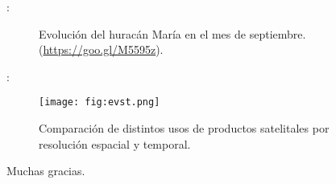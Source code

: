 \begin{frame}{\secname : \subsecname}
    \begin{figure}[h!]
    \centering
    \caption{Evolución del huracán María en el mes de septiembre. (\href{https://goo.gl/M5595z}{https://goo.gl/M5595z}).}
    \end{figure}
\end{frame}

\begin{frame}{\secname : \subsecname}
    \begin{figure}[h!]
        \centering
        \texttt{[image: fig:evst.png]}
        \caption{Comparación de distintos usos de productos satelitales por resolución espacial y temporal.}
        \label{fig:evst}
    \end{figure}
\end{frame}

\begin{frame}{\secname}
Muchas gracias.
\end{frame}
